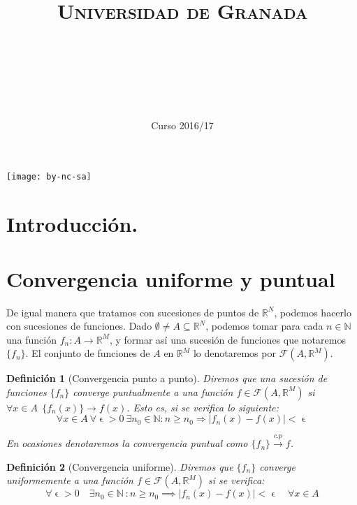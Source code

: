 \documentclass[11pt, a4paper]{article}
\title{
  \normalfont \normalsize 
  \textsc{Universidad de Granada} \\ [25pt]    %
  \horrule{0.5pt} \\[0.4cm] %
  \huge \subject\\ %
  \horrule{2pt} \\[0.5cm] %
}
\author{\Large{\docauthor}}
\date{\vspace{-1.5em} \normalsize Curso 2016/17}
\let\epsilon\upvarepsilon
\providecommand{\abs}[1]{\lvert#1\rvert}
\newcommand{\R}{\mathbb{R}}
\newcommand{\fn}{\{f_n\}}
\theoremstyle{theorem-style}
\theoremstyle{definition-style}
\newtheorem*{ndef}{Definición}
\theoremstyle{remark-style}
\theoremstyle{example-style}
\begin{document}
\maketitle  %
\vfill
\begin{center}
\texttt{[image: by-nc-sa]}  %
\end{center}
\newpage
\tableofcontents    %
\newpage



\section*{Introducción.}


\newpage


\section{Convergencia uniforme y puntual}
De igual manera que tratamos con sucesiones de puntos de $\R^N$, podemos hacerlo con sucesiones de funciones. Dado $\emptyset \ne A \subseteq \R^N$, podemos tomar para cada $n \in \mathbb{N}$ una función $f_n : A \to \R^M$, y formar así una sucesión de funciones que notaremos $\{f_n\}$. El conjunto de funciones de $A$ en $\mathbb{R}^M$ lo denotaremos por $\mathcal{F}(A,\mathbb{R}^M)$. 

\begin{ndef}[Convergencia punto a punto] Diremos que una sucesión de funciones $\fn$ converge puntualmente a una función $f\in \mathcal{F}(A,\mathbb{R}^M)$ si $\forall x \in A \ \ \{f_n(x)\} \rightarrow f(x)$. Esto es, si se verifica lo siguiente:
	\[
		\forall x\in A\ \forall \epsilon > 0\ \exists n_0 \in \mathbb{N}: n \ge n_0 \Rightarrow |f_n(x)-f(x)| < \epsilon 
	\]
	
En ocasiones denotaremos la convergencia puntual como $\fn \xrightarrow {c.p} f$. 
\end{ndef}


\begin{ndef}[Convergencia uniforme] Diremos que $\fn$ converge uniformemente a una función $f \in \mathcal{F}(A,\mathbb{R}^M)$ si se verifica:
	\[
	\forall \epsilon>0 \quad \exists n_0 \in \mathbb{N}\ : n\ge n_0\implies \abs{f_n(x)-f(x)} < \epsilon \quad \forall x \in A
	\]
\end{ndef}
\end{document}
